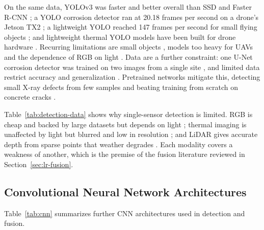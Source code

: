 On the same data, YOLOv3 was faster and better overall than SSD and Faster
R-CNN \citep{Srivastava2021}; a YOLO corrosion detector ran at 20.18 frames per
second on a drone's Jetson TX2 \citep{Yu2023}; a lightweight YOLO reached 147
frames per second for small flying objects \citep{Tao2021}; and lightweight
thermal YOLO models have been built for drone hardware
\citep{Liu2026c,Wang2024b,Wen2025}. Recurring limitations are small objects
\citep{Zhang2024,Srivastava2021,Chen2025}, models too heavy for UAVs
\citep{Jiang2025,Sun2023} and the dependence of RGB on light
\citep{Zhang2024,Lalitha2022,Wu2023,Wu2026}. Data are a further constraint: one
U-Net corrosion detector was trained on two images from a single site
\citep{Suzuki2026}, and limited data restrict accuracy and generalization
\citep{Hu2023}. Pretrained networks mitigate this, detecting small X-ray defects
from few samples \citep{Gong2022} and beating training from scratch on concrete
cracks \citep{Su2024}.

Table~\ref{tab:detection-data} shows why single-sensor detection is limited. RGB is cheap and backed by large datasets
\citep{Zhang2024,Srivastava2021,Suzuki2026} but depends on light \citep{Zhang2024,Lalitha2022,Wu2023,Wu2026}; thermal imaging is unaffected by light \citep{Liu2026c,Wen2025} but blurred and low in
resolution \citep{Liu2026c,Wang2024b,Wen2025}; and LiDAR gives accurate depth \citep{Naich2024,Prasanth2026,Soumya2026} from sparse points that weather degrades
\citep{Prasanth2026,Naich2024,Soumya2026}. Each modality covers a weakness of another, which is the premise of the fusion
literature reviewed in Section~\ref{sec:lr-fusion}.

\subsection{Convolutional Neural Network Architectures}

Table~\ref{tab:cnn} summarizes further CNN architectures used in detection and
fusion.

